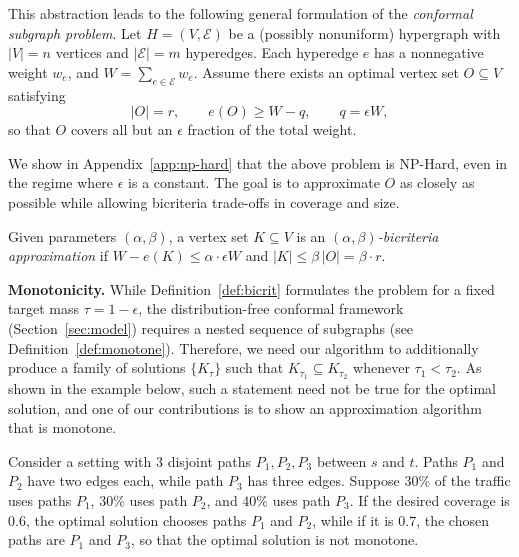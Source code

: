 This abstraction leads to the following general formulation of the \emph{conformal subgraph problem}. Let $H=(V,\mathcal E)$ be a (possibly nonuniform) hypergraph with $|V|=n$ vertices and $|\mathcal E|=m$ hyperedges. Each hyperedge $e$ has a nonnegative weight $w_e$, and $W = \sum_{e\in\mathcal E}w_e$. Assume there exists an optimal vertex set $O\subseteq V$ satisfying
\[
  |O| = r,
  \qquad
  e(O) \ge W - q,
  \qquad
  q = \epsilon W,
\]
so that $O$ covers all but an $\epsilon$ fraction of the total weight.

We show in Appendix~\ref{app:np-hard} that the above problem is {\sc NP-Hard}, even in the regime where $\epsilon$ is a constant.  The goal is to approximate $O$ as closely as possible while allowing bicriteria trade-offs in coverage and size.

\begin{definition}
\label{def:bicrit}
Given parameters $(\alpha,\beta)$, a vertex set $K\subseteq V$ is an \emph{$(\alpha,\beta)$-bicriteria approximation} if $
  W - e(K) \le \alpha\cdot \epsilon W$ and   $|K| \le \beta\,|O| = \beta \cdot r.$
\end{definition}


\noindent\textbf{Monotonicity.} While Definition~\ref{def:bicrit} formulates the problem for a fixed target mass $\tau = 1-\epsilon$, the distribution-free conformal framework (Section~\ref{sec:model}) requires a nested sequence of subgraphs (see Definition~\ref{def:monotone}). Therefore, we need our algorithm to additionally produce a family of solutions $\{K_\tau\}$ such that $K_{\tau_1} \subseteq K_{\tau_2}$ whenever $\tau_1 < \tau_2$. As shown in the example below, such a statement need not be true for the optimal solution, and one of our contributions is to show an approximation algorithm that is monotone.

\begin{example}
\label{eg:monotone}
Consider a setting with $3$ disjoint paths $P_1, P_2, P_3$ between $s$ and $t$. Paths $P_1$ and $P_2$ have two edges each, while path $P_3$ has three edges. Suppose $30\%$ of the traffic uses paths $P_1$, $30\%$ uses path $P_2$, and $40\%$ uses path $P_3$. If the desired coverage is $0.6$, the optimal solution chooses paths $P_1$ and $P_2$, while if it is $0.7$, the chosen paths are $P_1$ and $P_3$, so that the optimal solution is not monotone. 
\end{example}


